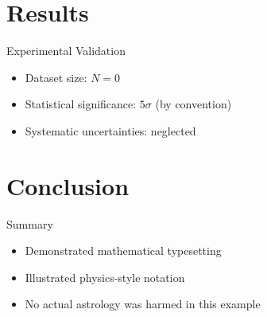 \documentclass{beamer}
\begin{document}
\section{Results}

\begin{frame}{Experimental Validation}
    \begin{itemize}
        \item Dataset size: $N = 0$
        \item Statistical significance: $5\sigma$ (by convention)
        \item Systematic uncertainties: neglected
    \end{itemize}
\end{frame}

\section{Conclusion}

\begin{frame}{Summary}
    \begin{itemize}
        \item Demonstrated mathematical typesetting
        \item Illustrated physics-style notation
        \item No actual astrology was harmed in this example
    \end{itemize}
\end{frame}
\end{document}
